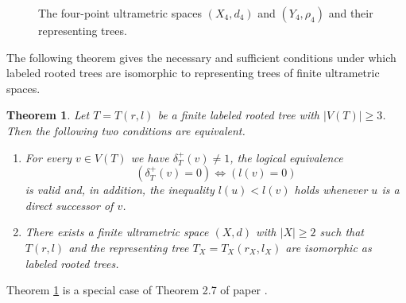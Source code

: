 \documentclass[pdflatex,sn-mathphys-num]{sn-jnl}%
\theoremstyle{thmstyleone}%
\newtheorem{Theorem}{Theorem}[section]
\theoremstyle{thmstyletwo}%
\theoremstyle{thmstylethree}%
\theoremstyle{thmstyletwo}%
\theoremstyle{thmstylethree}%
\begin{document}
\begin{figure}[ht]
\vspace{0.7cm}
\caption{The four-point ultrametric spaces $(X_4,d_4)$ and $(Y_4,\rho_4)$ and their representing trees.}
\label{fig1}
\end{figure}








The following theorem gives the necessary and sufficient conditions under which labeled rooted trees are isomorphic to  representing trees of finite ultrametric spaces.



\begin{Theorem}\label{edftt}
Let $T = T(r,l)$ be a finite labeled rooted tree with $|V(T)|\geq 3$. Then the following two conditions are equivalent.
\begin{enumerate}
\item[(i)] For every $v \in V(T)$ we have $\delta_T^{+}(v) \ne 1$, the logical equivalence
\[
(\delta_T^{+}(v)=0) \iff (l(v)=0)
\]
is valid and, in addition, the inequality
\(
l(u) < l(v)
\)
holds whenever $u$ is a direct successor of $v$.
\item[(ii)] There exists a finite  ultrametric space $(X,d)$ with $|X|\geq 2$ such that $T(r,l)$ and the representing tree $T_X=T_X(r_X,l_X)$ are isomorphic as labeled rooted trees.
\end{enumerate}
\end{Theorem}



Theorem \ref{edftt} is a special case of 
Theorem 2.7 of paper \cite{DP2019PNUAA}.
\end{document}
